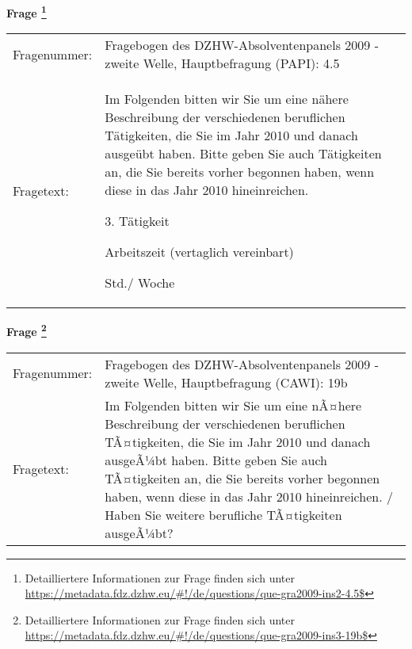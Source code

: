 				\vspace*{0.5cm}
                \noindent\textbf{Frage
	                \footnote{Detailliertere Informationen zur Frage finden sich unter
		              \url{https://metadata.fdz.dzhw.eu/\#!/de/questions/que-gra2009-ins2-4.5$}}}\\
				\begin{tabularx}{\hsize}{@{}lX}
					Fragenummer: &
					  Fragebogen des DZHW-Absolventenpanels 2009 - zweite Welle, Hauptbefragung (PAPI):
					  4.5
 \\
					Fragetext: & Im Folgenden bitten wir Sie um eine nähere Beschreibung der verschiedenen beruflichen Tätigkeiten, die Sie im Jahr 2010 und danach ausgeübt haben. Bitte geben Sie auch Tätigkeiten an, die Sie bereits vorher begonnen haben, wenn diese in das Jahr 2010 hineinreichen.\par  3. Tätigkeit\par  Arbeitszeit (vertaglich vereinbart)\par  Std./ Woche \\
				\end{tabularx}
				\vspace*{0.5cm}
                \noindent\textbf{Frage
	                \footnote{Detailliertere Informationen zur Frage finden sich unter
		              \url{https://metadata.fdz.dzhw.eu/\#!/de/questions/que-gra2009-ins3-19b$}}}\\
				\begin{tabularx}{\hsize}{@{}lX}
					Fragenummer: &
					  Fragebogen des DZHW-Absolventenpanels 2009 - zweite Welle, Hauptbefragung (CAWI):
					  19b
 \\
					Fragetext: & Im Folgenden bitten wir Sie um eine nÃ¤here Beschreibung der verschiedenen beruflichen TÃ¤tigkeiten, die Sie im Jahr 2010 und danach ausgeÃ¼bt haben. Bitte geben Sie auch TÃ¤tigkeiten an, die Sie bereits vorher begonnen haben, wenn diese in das Jahr 2010 hineinreichen. / Haben Sie weitere berufliche TÃ¤tigkeiten ausgeÃ¼bt? \\
				\end{tabularx}





